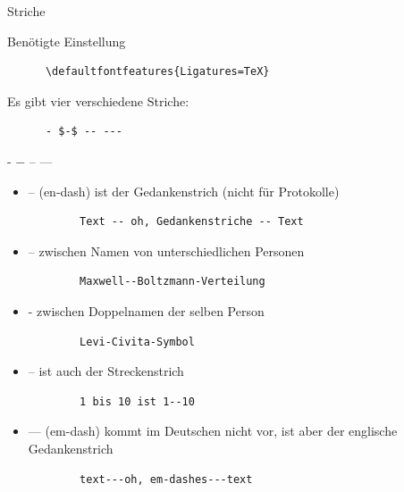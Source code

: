 \begin{frame}[fragile]{Striche}
  \begin{block}{Benötigte Einstellung}
    \begin{lstlisting}
      \defaultfontfeatures{Ligatures=TeX}
    \end{lstlisting}
  \end{block}
  Es gibt vier verschiedene Striche:
  \begin{CodeExample}{0.49}
    \begin{lstlisting}
      - $-$ -- ---
    \end{lstlisting}
  \CodeResult
    - $-$ -- ---
  \end{CodeExample}

  \begin{itemize}
    \item -- (en-dash) ist der Gedankenstrich (nicht für Protokolle)
      \begin{lstlisting}
        Text -- oh, Gedankenstriche -- Text
      \end{lstlisting}
    \item -- zwischen Namen von unterschiedlichen Personen
      \begin{lstlisting}
        Maxwell--Boltzmann-Verteilung
      \end{lstlisting}
    \item - zwischen Doppelnamen der selben Person
      \begin{lstlisting}
        Levi-Civita-Symbol
      \end{lstlisting}
    \item -- ist auch der Streckenstrich
      \begin{lstlisting}
        1 bis 10 ist 1--10
      \end{lstlisting}
    \item --- (em-dash) kommt im Deutschen nicht vor, ist aber der englische Gedankenstrich
      \begin{lstlisting}
        text---oh, em-dashes---text
      \end{lstlisting}
  \end{itemize}
\end{frame}

